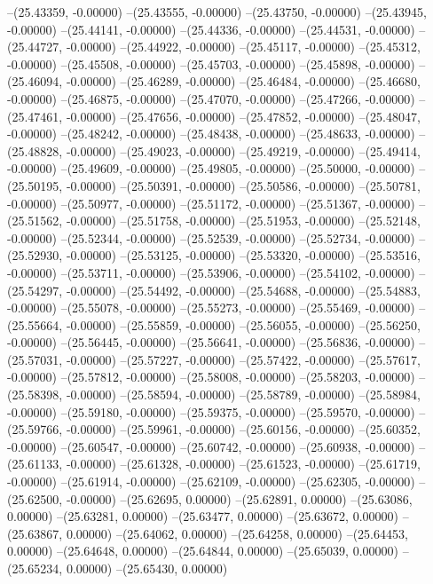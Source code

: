 --(25.43359, -0.00000)
--(25.43555, -0.00000)
--(25.43750, -0.00000)
--(25.43945, -0.00000)
--(25.44141, -0.00000)
--(25.44336, -0.00000)
--(25.44531, -0.00000)
--(25.44727, -0.00000)
--(25.44922, -0.00000)
--(25.45117, -0.00000)
--(25.45312, -0.00000)
--(25.45508, -0.00000)
--(25.45703, -0.00000)
--(25.45898, -0.00000)
--(25.46094, -0.00000)
--(25.46289, -0.00000)
--(25.46484, -0.00000)
--(25.46680, -0.00000)
--(25.46875, -0.00000)
--(25.47070, -0.00000)
--(25.47266, -0.00000)
--(25.47461, -0.00000)
--(25.47656, -0.00000)
--(25.47852, -0.00000)
--(25.48047, -0.00000)
--(25.48242, -0.00000)
--(25.48438, -0.00000)
--(25.48633, -0.00000)
--(25.48828, -0.00000)
--(25.49023, -0.00000)
--(25.49219, -0.00000)
--(25.49414, -0.00000)
--(25.49609, -0.00000)
--(25.49805, -0.00000)
--(25.50000, -0.00000)
--(25.50195, -0.00000)
--(25.50391, -0.00000)
--(25.50586, -0.00000)
--(25.50781, -0.00000)
--(25.50977, -0.00000)
--(25.51172, -0.00000)
--(25.51367, -0.00000)
--(25.51562, -0.00000)
--(25.51758, -0.00000)
--(25.51953, -0.00000)
--(25.52148, -0.00000)
--(25.52344, -0.00000)
--(25.52539, -0.00000)
--(25.52734, -0.00000)
--(25.52930, -0.00000)
--(25.53125, -0.00000)
--(25.53320, -0.00000)
--(25.53516, -0.00000)
--(25.53711, -0.00000)
--(25.53906, -0.00000)
--(25.54102, -0.00000)
--(25.54297, -0.00000)
--(25.54492, -0.00000)
--(25.54688, -0.00000)
--(25.54883, -0.00000)
--(25.55078, -0.00000)
--(25.55273, -0.00000)
--(25.55469, -0.00000)
--(25.55664, -0.00000)
--(25.55859, -0.00000)
--(25.56055, -0.00000)
--(25.56250, -0.00000)
--(25.56445, -0.00000)
--(25.56641, -0.00000)
--(25.56836, -0.00000)
--(25.57031, -0.00000)
--(25.57227, -0.00000)
--(25.57422, -0.00000)
--(25.57617, -0.00000)
--(25.57812, -0.00000)
--(25.58008, -0.00000)
--(25.58203, -0.00000)
--(25.58398, -0.00000)
--(25.58594, -0.00000)
--(25.58789, -0.00000)
--(25.58984, -0.00000)
--(25.59180, -0.00000)
--(25.59375, -0.00000)
--(25.59570, -0.00000)
--(25.59766, -0.00000)
--(25.59961, -0.00000)
--(25.60156, -0.00000)
--(25.60352, -0.00000)
--(25.60547, -0.00000)
--(25.60742, -0.00000)
--(25.60938, -0.00000)
--(25.61133, -0.00000)
--(25.61328, -0.00000)
--(25.61523, -0.00000)
--(25.61719, -0.00000)
--(25.61914, -0.00000)
--(25.62109, -0.00000)
--(25.62305, -0.00000)
--(25.62500, -0.00000)
--(25.62695, 0.00000)
--(25.62891, 0.00000)
--(25.63086, 0.00000)
--(25.63281, 0.00000)
--(25.63477, 0.00000)
--(25.63672, 0.00000)
--(25.63867, 0.00000)
--(25.64062, 0.00000)
--(25.64258, 0.00000)
--(25.64453, 0.00000)
--(25.64648, 0.00000)
--(25.64844, 0.00000)
--(25.65039, 0.00000)
--(25.65234, 0.00000)
--(25.65430, 0.00000)

